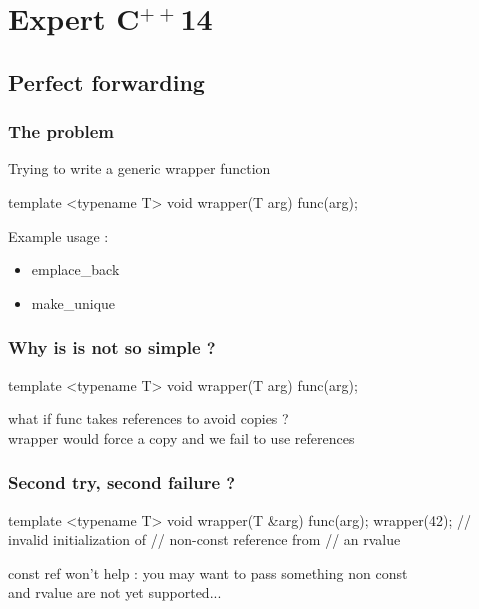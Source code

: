 \section[exp]{Expert C$^{++}$14}

\subsection[forward]{Perfect forwarding}

\begin{frame}[fragile]
  \frametitle{The problem}
  Trying to write a generic wrapper function
  \begin{cppcode*}{}
    template <typename T>
    void wrapper(T arg) {
      func(arg);
    }
  \end{cppcode*}
  Example usage :
  \begin{itemize}
  \item emplace\_back
  \item make\_unique
  \end{itemize}
\end{frame}

\begin{frame}[fragile]
  \frametitle{Why is is not so simple ?}
  \begin{cppcode*}{}
    template <typename T>
    void wrapper(T arg) {
      func(arg);
    }
  \end{cppcode*}
  \begin{alertblock}
    what if func takes references to avoid copies ?\\
    wrapper would force a copy and we fail to use references
  \end{alertblock}
\end{frame}

\begin{frame}[fragile]
  \frametitle{Second try, second failure ?}
  \begin{cppcode*}{}
    template <typename T>
    void wrapper(T &arg) {
      func(arg);
    }
    wrapper(42);
    // invalid initialization of
    // non-const reference from
    // an rvalue
  \end{cppcode*}
  \begin{alertblock}{}
    const ref won't help : you may want to pass something non const\\
    and rvalue are not yet supported...
  \end{alertblock}
\end{frame}

